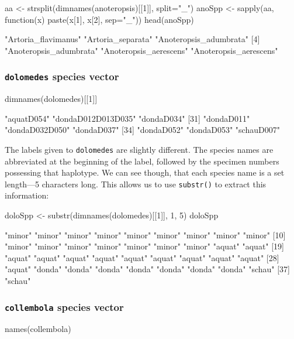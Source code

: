 \documentclass{article}
\newcommand{\fun}[1]{\texttt{#1}}
\begin{document}
\begin{console}
aa <- strsplit(dimnames(anoteropsis)[[1]], split="_")
anoSpp <- sapply(aa, function(x) paste(x[1], x[2], sep="_"))
head(anoSpp)
\end{console}

\begin{Routput}
[1] "Artoria_flavimanus"    "Artoria_separata"      "Anoteropsis_adumbrata"
[4] "Anoteropsis_adumbrata" "Anoteropsis_aerescens" "Anoteropsis_aerescens"
\end{Routput}

\subsubsection{\fun{dolomedes} species vector}

\begin{console}
dimnames(dolomedes)[[1]]
\end{console}

\begin{Routput}
[28] "aquatD054"             "dondaD012D013D035"     "dondaD034"            
[31] "dondaD011"             "dondaD032D050"         "dondaD037"            
[34] "dondaD052"             "dondaD053"             "schauD007"
\end{Routput}

The labels given to \fun{dolomedes} are slightly different. The species names are abbreviated at the beginning of the label, followed by the specimen numbers possessing that haplotype. We can see though, that each species name is a set length---5 characters long. This allows us to use \fun{substr()} to extract this information:

\begin{console}
doloSpp <- substr(dimnames(dolomedes)[[1]], 1, 5)
doloSpp
\end{console}

\begin{Routput}
 [1] "minor" "minor" "minor" "minor" "minor" "minor" "minor" "minor" "minor"
[10] "minor" "minor" "minor" "minor" "minor" "minor" "minor" "aquat" "aquat"
[19] "aquat" "aquat" "aquat" "aquat" "aquat" "aquat" "aquat" "aquat" "aquat"
[28] "aquat" "donda" "donda" "donda" "donda" "donda" "donda" "donda" "schau"
[37] "schau"
\end{Routput}


\subsubsection{\fun{collembola} species vector}
\begin{console}
names(collembola)
\end{console}
\end{document}
